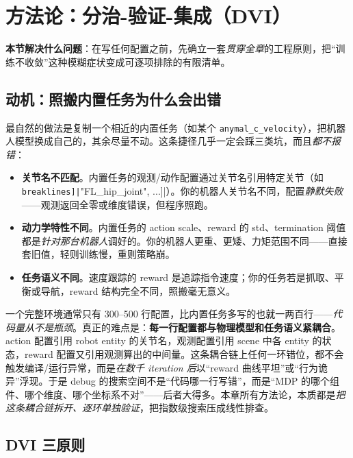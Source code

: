 \section{方法论：分治-验证-集成（DVI）}
\label{sec:rlmc-diy-dvi}

\textbf{本节解决什么问题}：在写任何配置之前，先确立一套\emph{贯穿全章}的工程原则，把“训练不收敛”这种模糊症状变成可逐项排除的有限清单。

\subsection{动机：照搬内置任务为什么会出错}
\label{sec:rlmc-diy-dvi-motivation}

最自然的做法是复制一个相近的内置任务（如某个 \texttt{anymal\_c\_velocity}），把机器人模型换成自己的，其余尽量不动。这条捷径几乎一定会踩三类坑，而且\emph{都不报错}：

\begin{itemize}
\item \textbf{关节名不匹配}。内置任务的观测/动作配置通过关节名引用特定关节（如 \Verb[breaklines]|["FL_hip_joint", ...]|）。你的机器人关节名不同，配置\emph{静默失败}——观测返回全零或维度错误，但程序照跑。
\item \textbf{动力学特性不同}。内置任务的 action scale、reward 的 std、termination 阈值都是\emph{针对那台机器人}调好的。你的机器人更重、更矮、力矩范围不同——直接套旧值，轻则训练慢，重则策略崩。
\item \textbf{任务语义不同}。速度跟踪的 reward 是追踪指令速度；你的任务若是抓取、平衡或导航，reward 结构完全不同，照搬毫无意义。
\end{itemize}

\begin{insight}\label{ins:rlmc-diy-coupling}
一个完整环境通常只有 300--500 行配置，比内置任务多写的也就一两百行——\emph{代码量从不是瓶颈}。真正的难点是：\textbf{每一行配置都与物理模型和任务语义紧耦合}。action 配置引用 robot entity 的关节名，观测配置引用 scene 中各 entity 的状态，reward 配置又引用观测算出的中间量。这条耦合链上任何一环错位，都不会触发编译/运行异常，而是\emph{在数千 iteration 后}以“reward 曲线平坦”或“行为诡异”浮现。于是 debug 的搜索空间不是“代码哪一行写错”，而是“MDP 的哪个组件、哪个维度、哪个坐标系不对”——后者大得多。本章所有方法论，本质都是\emph{把这条耦合链拆开、逐环单独验证}，把指数级搜索压成线性排查。
\end{insight}

\subsection{DVI 三原则}
\label{sec:rlmc-diy-dvi-three}

